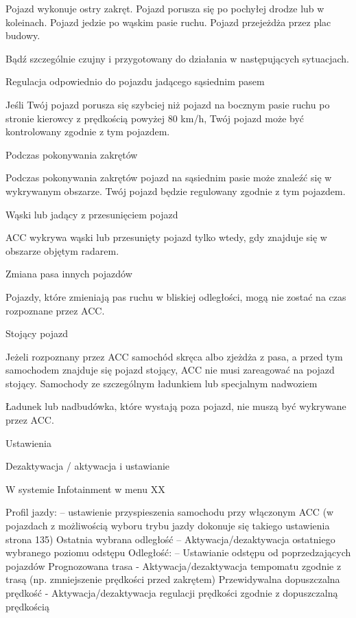\begin{itemizeTriangle}
	\itemTriangle Pojazd wykonuje ostry zakręt.
	\itemTriangle Pojazd porusza się po pochyłej drodze lub w koleinach.
	\itemTriangle Pojazd jedzie po wąskim pasie ruchu.
	\itemTriangle Pojazd przejeżdża przez plac budowy.
\end{itemizeTriangle}


\begin{itemizeTriangle}
	\itemTriangle Bądź szczególnie czujny i przygotowany do działania w następujących sytuacjach.
\end{itemizeTriangle}

Regulacja odpowiednio do pojazdu jadącego sąsiednim pasem

Jeśli Twój pojazd porusza się szybciej niż pojazd na bocznym pasie ruchu po stronie kierowcy z prędkością powyżej 80 km/h, Twój pojazd może być kontrolowany zgodnie z tym pojazdem.

Podczas pokonywania zakrętów

Podczas pokonywania zakrętów pojazd na sąsiednim pasie może znaleźć się w wykrywanym obszarze.
Twój pojazd będzie regulowany zgodnie z tym pojazdem.

Wąski lub jadący z przesunięciem pojazd

ACC wykrywa wąski lub przesunięty pojazd tylko wtedy, gdy znajduje się w obszarze objętym radarem.

Zmiana pasa innych pojazdów

Pojazdy, które zmieniają pas ruchu w bliskiej odległości, mogą nie zostać na czas rozpoznane przez ACC.

Stojący pojazd

Jeżeli rozpoznany przez ACC samochód skręca albo zjeżdża z pasa, a przed tym samochodem znajduje się pojazd stojący, ACC nie musi zareagować na pojazd
stojący.
Samochody ze szczególnym ładunkiem lub specjalnym nadwoziem

Ładunek lub nadbudówka, które wystają poza pojazd, nie muszą być wykrywane przez ACC.

Ustawienia

Dezaktywacja / aktywacja i ustawianie

W systemie Infotainment w menu XX

\begin{itemizeTriangle}
	\itemTriangle Profil jazdy: – ustawienie przyspieszenia samochodu przy włączonym ACC (w pojazdach z możliwością wyboru trybu jazdy dokonuje się takiego ustawienia \guillemotright strona 135)
	\itemTriangle Ostatnia wybrana odległość – Aktywacja/dezaktywacja ostatniego wybranego poziomu odstępu
	\itemTriangle Odległość: – Ustawianie odstępu od poprzedzających pojazdów
	\itemTriangle Prognozowana trasa - Aktywacja/dezaktywacja tempomatu zgodnie z trasą (np. zmniejszenie prędkości przed zakrętem)
	\itemTriangle Przewidywalna dopuszczalna prędkość - Aktywacja/dezaktywacja regulacji prędkości zgodnie z dopuszczalną prędkością
\end{itemizeTriangle}

